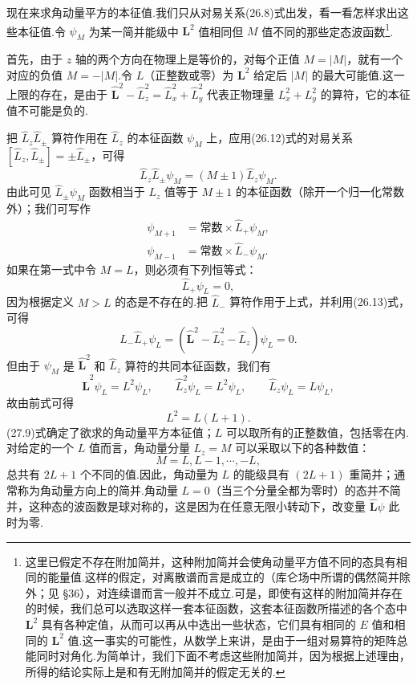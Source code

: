 现在来求角动量平方的本征值.我们只从对易关系(26.8)式出发，看一看怎样求出这些本征值.令 $\psi_M$ 为某一简并能级中 $\boldsymbol{L}^2$ 值相同但 $M$ 值不同的那些定态波函数\footnote{这里已假定不存在附加简并，这种附加简并会使角动量平方值不同的态具有相同的能量值.这样的假定，对离散谱而言是成立的（库仑场中所谓的偶然简并除外；见 §36），对连续谱而言一般并不成立.可是，即使有这样的附加简并存在的时候，我们总可以选取这样一套本征函数，这套本征函数所描述的各个态中 $\boldsymbol{L}^2$ 具有各种定值，从而可以再从中选出一些状态，它们具有相同的 $E$ 值和相同的 $\boldsymbol{L}^2$ 值.这一事实的可能性，从数学上来讲，是由于一组对易算符的矩阵总能同时对角化.为简单计，我们下面不考虑这些附加简并，因为根据上述理由，所得的结论实际上是和有无附加简并的假定无关的.}.

首先，由于 $z$ 轴的两个方向在物理上是等价的，对每个正值 $M=|M|$，就有一个对应的负值 $M=-|M|$.令 $L$（正整数或零）为 $\boldsymbol{L}^2$ 给定后 $|M|$ 的最大可能值.这一上限的存在，是由于 $\hat{\boldsymbol{L}}^2-\hat{L}_z^2=\hat{L}_x^2+\hat{L}_y^2$ 代表正物理量 $L_x^2+L_y^2$ 的算符，它的本征值不可能是负的.

把 $\hat{L}_z\hat{L}_\pm$ 算符作用在 $\hat{L}_z$ 的本征函数 $\psi_M$ 上，应用(26.12)式的对易关系 $[\hat{L}_z,\hat{L}_\pm]=\pm\hat{L}_\pm$，可得
\begin{equation}
  \hat{L}_z\hat{L}_{\pm}\psi_M=(M\pm1)\hat{L}_z\psi_M.
\end{equation}
由此可见 $\hat{L}_{\pm}\psi_M$ 函数相当于 $L_z$ 值等于 $M\pm1$ 的本征函数（除开一个归一化常数外）；我们可写作
\begin{equation}
\begin{aligned}
  \psi_{M+1}&=\text{常数}\times\hat{L}_+\psi_M,\\
  \psi_{M-1}&=\text{常数}\times\hat{L}_-\psi_M.
\end{aligned}
\end{equation}
如果在第一式中令 $M=L$，则必须有下列恒等式：
\begin{equation}
  \hat{L}_+\psi_L=0,
\end{equation}
因为根据定义 $M>L$ 的态是不存在的.把 $\hat{L}_-$ 算符作用于上式，并利用(26.13)式，可得
\begin{equation*}
  \hat{L}_-\hat{L}_+\psi_L
  =\left(\hat{\boldsymbol{L}}^2-\hat{L}_z^2-\hat{L}_z\right)\psi_L=0.
\end{equation*}
但由于 $\psi_M$ 是 $\hat{\boldsymbol{L}}^2$ 和 $\hat{L}_z$ 算符的共同本征函数，我们有
\begin{equation*}
  \hat{\boldsymbol{L}}^2\psi_L=L^2\psi_L,\qquad
  \hat{L}_z^2\psi_L=L^2\psi_L,\qquad
  \hat{L}_z\psi_L=L\psi_L,
\end{equation*}
故由前式可得
\begin{equation}
  L^2=L(L+1).
\end{equation}
(27.9)式确定了欲求的角动量平方本征值；$L$ 可以取所有的正整数值，包括零在内.对给定的一个 $L$ 值而言，角动量分量 $L_z=M$ 可以采取以下的各种数值：
\begin{equation}
  M=L,L-1,\cdots,-L,
\end{equation}
总共有 $2L+1$ 个不同的值.因此，角动量为 $L$ 的能级具有 $(2L+1)$ 重简并；通常称为角动量方向上的简并.角动量 $L=0$（当三个分量全都为零时）的态并不简并，这种态的波函数是球对称的，这是因为在任意无限小转动下，改变量 $\hat{\boldsymbol{L}}\psi$ 此时为零.

